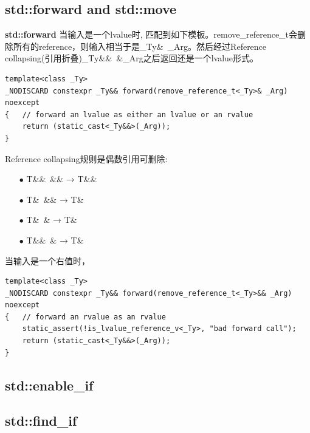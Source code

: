 \documentclass[12pt]{book}
\begin{document}
\subsection{std::forward and std::move}
\textbf{std::forward}\newline
当输入是一个lvalue时, 匹配到如下模板。remove\_reference\_t会删除所有的reference，则输入相当于是\_Ty\&\ \_Arg。然后经过Reference collapsing(引用折叠)\_Ty\&\&\ \&\_Arg之后返回还是一个lvalue形式。
\begin{lstlisting}
template<class _Ty>
_NODISCARD constexpr _Ty&& forward(remove_reference_t<_Ty>& _Arg) noexcept
{	// forward an lvalue as either an lvalue or an rvalue
	return (static_cast<_Ty&&>(_Arg));
}
\end{lstlisting}
Reference collapsing规则是偶数引用可删除:\newline
\begin{itemize}
\item[$\bullet$] T\&\&\ \&\& → T\&\&
\item[$\bullet$] T\&\ \&\& → T\&
\item[$\bullet$] T\&\ \& → T\&
\item[$\bullet$] T\&\&\ \& → T\&
\end{itemize}
当输入是一个右值时，
\begin{lstlisting}
template<class _Ty>
_NODISCARD constexpr _Ty&& forward(remove_reference_t<_Ty>&& _Arg) noexcept
{	// forward an rvalue as an rvalue
	static_assert(!is_lvalue_reference_v<_Ty>, "bad forward call");
	return (static_cast<_Ty&&>(_Arg));
}
\end{lstlisting}

\subsection{std::enable\_if}
\subsection{std::find\_if}
\end{document}
